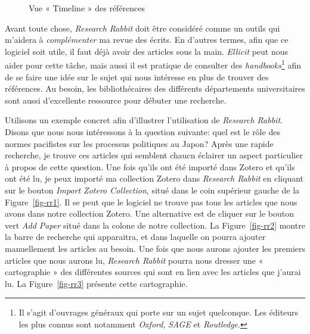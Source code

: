 \documentclass[
  letterpaper,
  DIV=11,
  numbers=noendperiod]{scrreprt}
\begin{document}
\begin{figure}


\caption{\label{fig-rr4}Vue « Timeline » des références}

\end{figure}%

Avant toute chose, \emph{Research Rabbit} doit être considéré comme un
outils qui m'aidera à \emph{complémenter} ma revue des écrits. En
d'autres termes, afin que ce logiciel soit utile, il faut déjà avoir des
articles sous la main. \emph{Ellicit} peut nous aider pour cette tâche,
mais aussi il est pratique de consulter des \emph{handbooks}\footnote{Il
  s'agit d'ouvrages généraux qui porte sur un sujet quelconque. Les
  éditeurs les plus connus sont notamment \emph{Oxford}, \emph{SAGE} et
  \emph{Routledge}.} afin de se faire une idée sur le sujet qui nous
intéresse en plus de trouver des références. Au besoin, les
bibliothécaires des différents départements universitaires sont aussi
d'excellente ressource pour débuter une recherche.

Utilisons un exemple concret afin d'illustrer l'utilisation de
\emph{Research Rabbit}. Disons que nous nous intéressons à la question
suivante: quel est le rôle des normes pacifistes sur les processus
politiques au Japon? Après une rapide recherche, je trouve ces articles
qui semblent chaucn éclairer un aspect particulier à propos de cette
question. Une fois qu'ils ont été importé dans Zotero et qu'ils ont été
lu, je peux importé ma collection Zotero dans \emph{Research Rabbit} en
cliquant sur le bouton \emph{Import Zotero Collection}, situé dans le
coin supérieur gauche de la Figure~\ref{fig-rr1}. Il se peut que le
logiciel ne trouve pas tous les articles que nous avons dans notre
collection Zotero. Une alternative est de cliquer sur le bouton vert
\emph{Add Paper} situé dans la colone de notre collection. La
Figure~\ref{fig-rr2} montre la barre de recherche qui apparaitra, et
dans laquelle on pourra ajouter manuellement les articles au besoin. Une
fois que nous aurons ajouter les premiers articles que nous aurons lu,
\emph{Research Rabbit} pourra nous dresser une « cartographie » des
différentes sources qui sont en lien avec les articles que j'aurai lu.
La Figure~\ref{fig-rr3} présente cette cartographie.
\end{document}
